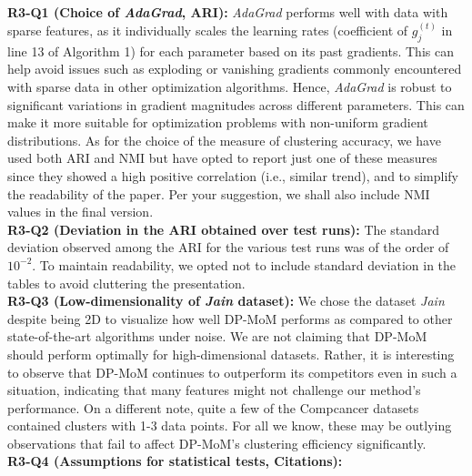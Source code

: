 \documentclass{article}
\newcommand{\jrc}[1]{\textcolor{blue}{[#1]}}
\begin{document}
\textbf{R3-Q1 (Choice of \textit{AdaGrad}, ARI):} \textit{AdaGrad} performs well with data with sparse features, as it individually scales the learning rates (coefficient of $g_j^{(t)}$ in line 13 of Algorithm 1) for each parameter based on its past gradients. This can help avoid issues such as exploding or vanishing gradients commonly encountered with sparse data in other optimization algorithms. Hence, \textit{AdaGrad} is robust to significant variations in gradient magnitudes across different parameters. This can make it more suitable for optimization problems with non-uniform gradient distributions. As for the choice of the measure of clustering accuracy, we have used both ARI and NMI but have opted to report just one of these measures since they showed a high positive correlation (i.e., similar trend), and to simplify the readability of the paper. Per your suggestion, we shall also include NMI values in the final version.\\
\textbf{R3-Q2 (Deviation in the ARI obtained over test runs):} 
The standard deviation observed among the ARI for the various test runs was of the order of $10^{-2}$. To maintain readability, we opted not to include standard deviation in the tables to avoid cluttering the presentation.\\
\textbf{R3-Q3 (Low-dimensionality of \textit{Jain} dataset):} We chose the dataset \textit{Jain} despite being 2D to visualize how well DP-MoM performs as compared to other state-of-the-art algorithms under noise. We are not claiming that DP-MoM should perform optimally for high-dimensional datasets. Rather, it is interesting to observe that DP-MoM continues to outperform its competitors even in such a situation, indicating that many features might not challenge our method's performance. On a different note, quite a few of the Compcancer datasets contained clusters with 1-3 data points. For all we know, these may be outlying observations that fail to affect DP-MoM's clustering efficiency significantly.\\
\textbf{R3-Q4 (Assumptions for statistical tests, Citations):} %
\end{document}
